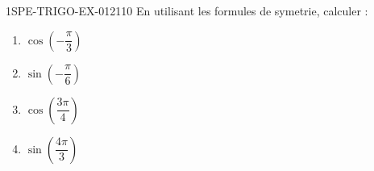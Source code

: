 \begin{exercice}{1SPE-TRIGO-EX-012}{1}{10}
En utilisant les formules de symetrie, calculer :
\begin{enumerate}
  \item $\cos\!\left(-\dfrac{\pi}{3}\right)$
  \item $\sin\!\left(-\dfrac{\pi}{6}\right)$
  \item $\cos\!\left(\dfrac{3\pi}{4}\right)$
  \item $\sin\!\left(\dfrac{4\pi}{3}\right)$
\end{enumerate}
\end{exercice}
